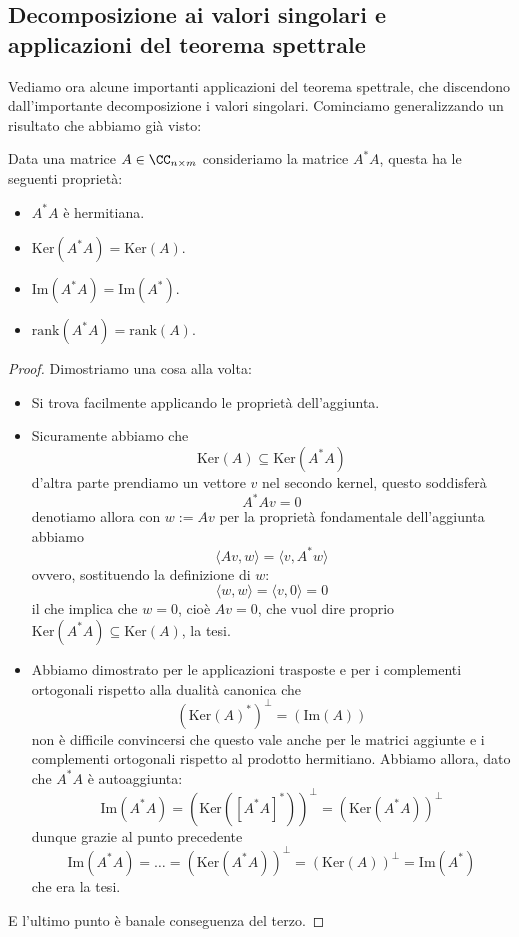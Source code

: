 \documentclass[11pt]{scrartcl}
\newcommand{\Immagine}[1]{\text{Im}\left(#1\right)}
\renewcommand{\rank}[1]{\text{rank}\!\left(#1\right)}
\renewcommand{\ker}[1]{\text{Ker}\left(#1\right)}
\begin{document}
   	 \subsection{Decomposizione ai valori singolari e applicazioni del teorema spettrale}
   	 Vediamo ora alcune importanti applicazioni del teorema spettrale, che discendono dall'importante decomposizione i valori singolari.
   	 Cominciamo generalizzando un risultato che abbiamo già visto:
   	 \begin{lemma}
   	 	Data una matrice $A\in\CC_{n\times m}$ consideriamo la matrice $A^*A$, questa ha le seguenti proprietà:
   	 	\begin{itemize}
   	 		\item $A^*A$ è hermitiana.
   	 		\item $\ker{A^*A}=\ker{A}$.
   	 		\item $\Immagine{A^*A}=\Immagine{A^*}$.
   	 		\item $\rank{A^*A}=\rank{A}$.
   	 	\end{itemize}
   	 \end{lemma}
   	 \begin{proof}
		Dimostriamo una cosa alla volta:
		\begin{itemize}
			\item Si trova facilmente applicando le proprietà dell'aggiunta.
			\item Sicuramente abbiamo che 
			$$\ker{A}\subseteq \ker{A^*A}$$
			d'altra parte prendiamo un vettore $v$ nel secondo kernel, questo soddisferà
			$$A^*Av=0$$
			denotiamo allora con $w:=Av$ per la proprietà fondamentale dell'aggiunta abbiamo
			$$\langle Av,w\rangle = \langle v,A^*w\rangle$$
			ovvero, sostituendo la definizione di $w$:
			$$\langle w,w\rangle=\langle v,0\rangle =0$$
			il che implica che $w=0$, cioè $Av=0$, che vuol dire proprio $\ker{A^*A}\subseteq \ker{A}$, la tesi.
			\item Abbiamo dimostrato per le applicazioni trasposte e per i complementi ortogonali rispetto alla dualità canonica che
			$$\left(\ker A^*\right)^\perp=\left(\Immagine{A}\right)$$
			non è difficile convincersi che questo vale anche per le matrici aggiunte e i complementi ortogonali rispetto al prodotto hermitiano. Abbiamo allora, dato che $A^*A$ è autoaggiunta:
			$$\Immagine{A^*A}=\left(\ker{\left[A^*A\right]^*}\right)^\perp=\left(\ker{A^*A}\right)^\perp$$
			dunque grazie al punto precedente
			$$\Immagine{A^*A}=\dots=\left(\ker{A^*A}\right)^\perp=\left(\ker{A}\right)^\perp=\Immagine{A^*}$$
			che era la tesi.
		\end{itemize}
		E l'ultimo punto è banale conseguenza del terzo.
   	 \end{proof}
\end{document}
